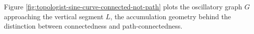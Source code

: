 \noindent Figure \ref{fig:topologist-sine-curve-connected-not-path} plots the oscillatory graph $G$ approaching the vertical segment $L$, the accumulation geometry behind the distinction between connectedness and path-connectedness.

\begin{visualizationfigure}[H]
  \centering
  
  \caption{Topologist's sine curve: \textcolor{red!75!black}{$y=\sin(1/x)$} accumulates on \textcolor{blue!70!black}{$\{0\}\times[-1,1]$}; connected, not path-connected.}
  \label{fig:topologist-sine-curve-connected-not-path}
\end{visualizationfigure}
